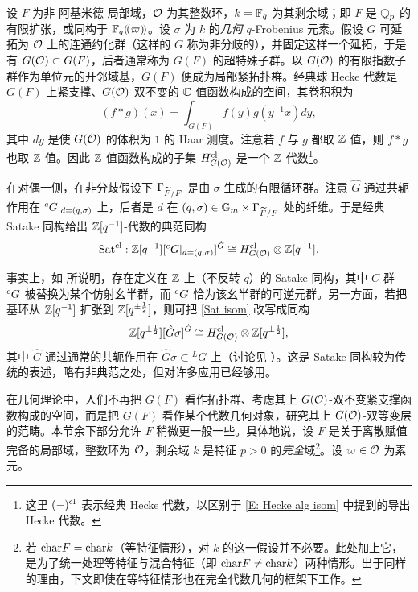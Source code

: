 设 $F$ 为非 阿基米德 局部域，${\mathcal O}$ 为其整数环，$k={\mathbb F}_q$ 为其剩余域；即 $F$ 是 ${\mathbb Q}_p$ 的有限扩张，或同构于 ${\mathbb F}_q(\!(\varpi)\!)$。设 $\sigma$ 为 $k$ 的\emph{几何} $q$-Frobenius 元素。假设 $G$ 可延拓为 ${\mathcal O}$ 上的连通约化群（这样的 $G$ 称为非分歧的），并固定这样一个延拓，于是有 $G({\mathcal O})\subset G(F)$，后者通常称为 $G(F)$ 的超特殊子群。以 $G({\mathcal O})$ 的有限指数子群作为单位元的开邻域基，$G(F)$ 便成为局部紧拓扑群。经典球 Hecke 代数是 $G(F)$ 上紧支撑、$G({\mathcal O})$-双不变的 ${\mathbb C}$-值函数构成的空间，其卷积积为
\begin{equation}\label{E:conv prod alge}
(f*g)(x)=\int_{G(F)}f(y)g(y^{-1}x)dy,
\end{equation}
其中 $dy$ 是使 $G({\mathcal O})$ 的体积为 $1$ 的 Haar 测度。注意若 $f$ 与 $g$ 都取 ${\mathbb Z}$ 值，则 $f*g$ 也取 ${\mathbb Z}$ 值。因此 ${\mathbb Z}$ 值函数构成的子集 $H^{{\operatorname{cl}}}_{G({\mathcal O})}$ 是一个 ${\mathbb Z}$-代数\footnote{这里 $(-)^{{\operatorname{cl}}}$ 表示经典 Hecke 代数，以区别于 \eqref{E: Hecke alg isom} 中提到的导出 Hecke 代数。}。

在对偶一侧，在非分歧假设下 ${\Gamma}_{\widetilde F/F}$ 是由 $\sigma$ 生成的有限循环群。注意 $\hat G$ 通过共轭作用在 ${}^cG|_{d=(q,\sigma)}$ 上，后者是 $d$ 在 $(q,\sigma)\in{\mathbb G}_m\times{\Gamma}_{\widetilde F/F}$ 处的纤维。于是经典 Satake 同构给出 ${\mathbb Z}[q^{-1}]$-代数的典范同构
\begin{equation}\label{Sat isom}
{\operatorname{Sat}}^{{\operatorname{cl}}}: {\mathbb Z}[q^{-1}][{}^cG|_{d=(q,\sigma)}]^{\hat{G}}\cong H^{{\operatorname{cl}}}_{G({\mathcal O})}\otimes {\mathbb Z}[q^{-1}].
\end{equation}

\begin{rmk}
事实上，如 \cite{Zhu-Integral-Satake} 所说明，存在定义在 ${\mathbb Z}$ 上（不反转 $q$）的 Satake 同构，其中 $C$-群 ${}^cG$ 被替换为某个仿射幺半群，而 ${}^cG$ 恰为该幺半群的可逆元群。另一方面，若把基环从 ${\mathbb Z}[q^{-1}]$ 扩张到 ${\mathbb Z}[q^{\pm \frac{1}{2}}]$，则可把 \eqref{Sat isom} 改写成同构
\begin{equation}\label{Sat isom classical}
 {\mathbb Z}[q^{\pm \frac{1}{2}}][\hat{G}\sigma]^{\hat{G}}\cong H^{{\operatorname{cl}}}_{G({\mathcal O})}\otimes {\mathbb Z}[q^{\pm \frac{1}{2}}],
\end{equation}
其中 $\hat{G}$ 通过通常的共轭作用在 $\hat{G}\sigma\subset {}^LG$ 上（讨论见 \cite{Zhu-Integral-Satake}）。这是 Satake 同构较为传统的表述，略有非典范之处，但对许多应用已经够用。
\end{rmk}

在几何理论中，人们不再把 $G(F)$ 看作拓扑群、考虑其上 $G({\mathcal O})$-双不变紧支撑函数构成的空间，而是把 $G(F)$ 看作某个代数几何对象，研究其上 $G({\mathcal O})$-双等变层的范畴。本节余下部分允许 $F$ 稍微更一般一些。具体地说，设 $F$ 是关于离散赋值完备的局部域，整数环为 ${\mathcal O}$，剩余域 $k$ 是特征 $p>0$ 的\emph{完全}域\footnote{若 ${\operatorname{char}} F={\operatorname{char}} k$（等特征情形），对 $k$ 的这一假设并不必要。此处加上它，是为了统一处理等特征与混合特征（即 ${\operatorname{char}} F\neq {\operatorname{char}} k$）两种情形。出于同样的理由，下文即使在等特征情形也在完全代数几何的框架下工作。}。设 $\varpi\in{\mathcal O}$ 为素元。

